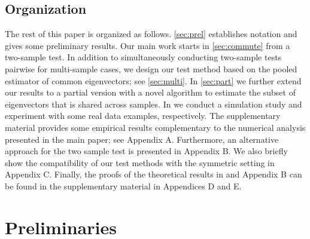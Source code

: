 \documentclass[12pt]{article}
\numberwithin{thm}{section}
\numberwithin{defn}{section}
\numberwithin{lem}{section}
\numberwithin{prop}{section}
\numberwithin{cor}{section}
\numberwithin{rem}{section}
\begin{document}
\subsection{Organization}
\vspace{-0.3cm}
The rest of this paper is organized as follows. \autoref{sec:prel} establishes notation and gives some preliminary results.
Our main work starts in \autoref{sec:commute} from a two-sample test. In addition to simultaneously conducting two-sample tests pairwise for multi-sample cases, we design our test method based on the pooled estimator of common eigenvectors; see \autoref{sec:multi}. In \autoref{sec:part} we further extend our results to a partial version with a novel algorithm to estimate the subset of eigenvectors that is shared across samples. In  we conduct a simulation study and experiment with some real data examples, respectively. The supplementary material provides some empirical results complementary to the numerical analysis presented in the main paper; see {\color{cyan} Appendix A}.
Furthermore, an alternative approach for the two sample test is presented in {\color{cyan} Appendix B}.
We also briefly show the compatibility of our test methods with the symmetric setting in {\color{cyan} Appendix C}. Finally, the proofs of the theoretical results in  and {\color{cyan} Appendix B} can be found in the supplementary material in {\color{cyan} Appendices D} and {\color{cyan} E}.



\vspace{-0.5cm}
\section{Preliminaries} \label{sec:prel}
\vspace{-0.3cm}
\end{document}
